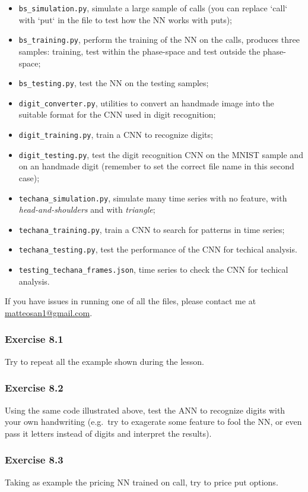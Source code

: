 \documentclass[11pt]{article}
\begin{document}
\begin{itemize}
\item \verb|bs_simulation.py|, simulate a large sample of calls (you can replace `call` with `put` in the file to test how the NN works with puts); 
\item \verb|bs_training.py|, perform the training of the NN on the calls, produces three samples: training, test within the phase-space and test outside the phase-space;
\item \verb|bs_testing.py|, test the NN on the testing samples;
\item \verb|digit_converter.py|, utilities to convert an handmade image into the suitable format for the CNN used in digit recognition;
\item \verb|digit_training.py|, train a CNN to recognize digits;
\item \verb|digit_testing.py|, test the digit recognition CNN on the MNIST sample and on an handmade digit (remember to set the correct file name in this second case);
\item \verb|techana_simulation.py|, simulate many time series with no feature, with \emph{head-and-shoulders} and with \emph{triangle};
\item \verb|techana_training.py|, train a CNN to search for patterns in time series;
\item \verb|techana_testing.py|, test the performance of the CNN for techical analysis.
\item \verb|testing_techana_frames.json|, time series to check the CNN for techical analysis.  
\end{itemize}

If you have issues in running one of all the files, please contact me at \href{mailto:matteosan1@gmail.com}{matteosan1@gmail.com}.

\hypertarget{exercise-8.1}{%
\subsubsection{Exercise 8.1}\label{exercise-8.1}}

Try to repeat all the example shown during the lesson.

\hypertarget{exercise-8.2}{%
\subsubsection{Exercise 8.2}\label{exercise-8.2}}

Using the same code illustrated above, test the ANN to recognize digits
with your own handwriting (e.g.~try to exagerate some feature to fool
the NN, or even pass it letters instead of digits and interpret the
results).

\hypertarget{exercise-8.3}{%
\subsubsection{Exercise 8.3}\label{exercise-8.3}}

Taking as example the pricing NN trained on call, try to price put
options.


    
    
    
\end{document}

